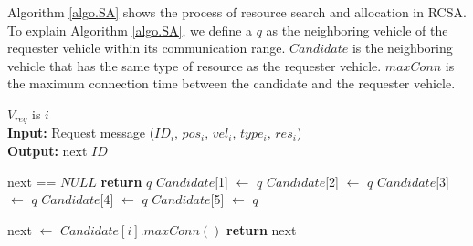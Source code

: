 \documentclass[sensors,article,accept,moreauthors,pdftex]{Definitions/mdpi}
\begin{document}
Algorithm \ref{algo.SA} shows the process of resource search and allocation in RCSA. To explain Algorithm \ref{algo.SA}, we define a $q$ as the neighboring vehicle of the requester vehicle within its communication range. $Candidate$ is the neighboring vehicle that has the same type of resource as the requester vehicle.
$maxConn$ is the maximum connection time between the candidate and the requester vehicle.


\begin{algorithm}[H]
    \caption{Resource  search and allocation} \label{algo.SA}
    \textbf {$V_{req}$} is $i$\\
    \textbf{Input: } Request message ($ID_i$, $pos_i$, $vel_i$, $type_i$, $res_i$)\\
    \textbf{Output: } next $ID$\\
    \begin{algorithmic}[1]
    \State next == $NULL$
                \State \textbf{return} $q$
            \Else                
                \State $Candidate$[1] $\leftarrow$ $q$
            \EndIf
        \Else
                \State $Candidate$[2] $\leftarrow$ $q$
            \Else
                    \State $Candidate$[3] $\leftarrow$ $q$
                \Else
                        \State $Candidate$[4] $\leftarrow$ $q$
                    \Else
                        \State $Candidate$[5] $\leftarrow$ $q$
                    \EndIf
                \EndIf
            \EndIf
        \EndIf
    \EndFor
        
            \State next $\leftarrow$ $Candidate[i].maxConn()$
            \State \textbf{return} next
        \EndIf
    \EndFor
    \end{algorithmic}
\end{algorithm}
\end{document}
